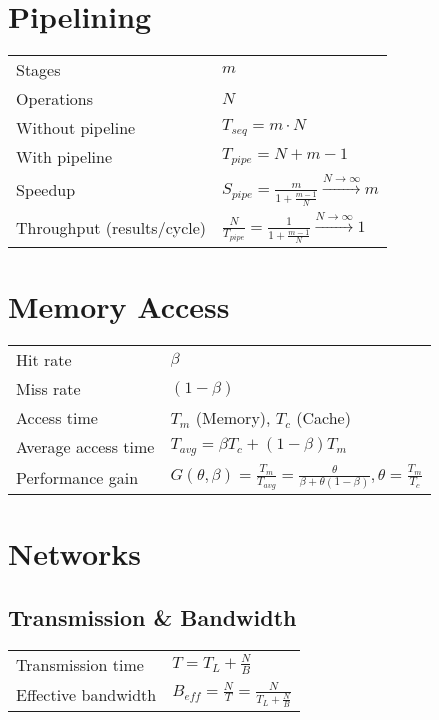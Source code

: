 \documentclass[11pt]{article}
\begin{document}
\section{Pipelining}

\begin{tabular}{ p{7cm} l }
	Stages & $m$ \\
	Operations & $N$ \\
	Without pipeline & \( T_{seq} = m \cdot N \) \\
	With pipeline & \( T_{pipe} = N + m − 1 \) \\
	Speedup & \(S_{pipe} = \frac{m}{1 + \frac{m-1}{N}} \xrightarrow{N \rightarrow \infty} m \) \\
	Throughput (results/cycle) & \( \frac{N}{T_{pipe}} = \frac{1}{1 + \frac{m-1}{N}} \xrightarrow{N \rightarrow \infty} 1 \) \\
\end{tabular}

\section{Memory Access}

\begin{tabular}{ p{7cm} l }
	Hit rate & $\beta$ \\
	Miss rate & $(1 - \beta)$ \\
	Access time& $T_m$ (Memory), $T_c$ (Cache) \\
	Average access time & \( T_{avg} = \beta T_c + (1 - \beta) T_m \) \\
	Performance gain & \( G( \theta, \beta ) = \frac{T_m}{T_{avg}} = \frac{\theta}{\beta + \theta(1 - \beta)},  \theta = \frac{T_m}{T_c} \) \\
\end{tabular}

\section{Networks}

\subsection{Transmission \& Bandwidth}

\begin{tabular}{ p{7cm} l }
	Transmission time & \( T = T_L + \frac{N}{B} \) \\
	Effective bandwidth & \( B_{eff} = \frac{N}{T} = \frac{N}{T_L + \frac{N}{B}} \) \\
\end{tabular}
\end{document}

